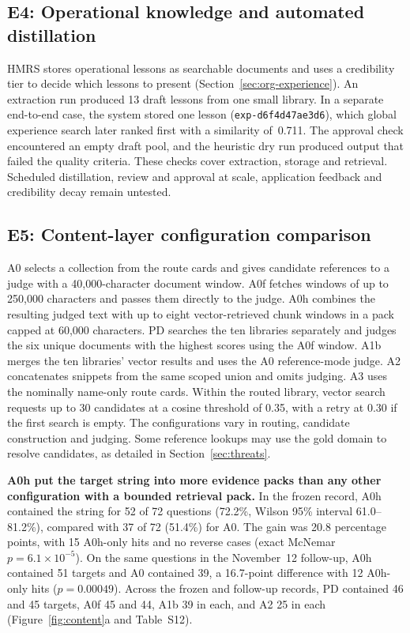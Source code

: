\subsection{E4: Operational knowledge and automated distillation}
\label{sec:e3}
HMRS stores operational lessons as searchable documents and uses a
credibility tier to decide which lessons to present
(Section~\ref{sec:org-experience}). An extraction run produced 13 draft
lessons from one small library. In a separate end-to-end case, the system
stored one lesson (\texttt{exp-d6f4d47ae3d6}), which global experience
search later ranked first with a similarity of~0.711. The approval check
encountered an empty draft pool, and the heuristic dry run produced output
that failed the quality criteria. These checks cover extraction, storage
and retrieval. Scheduled distillation, review and approval at scale,
application feedback and credibility decay remain untested.

\subsection{E5: Content-layer configuration comparison}
\label{sec:ladder-opt}
A0 selects a collection from the route cards and gives candidate references
to a judge with a 40{,}000-character document window. A0f fetches windows of
up to 250{,}000 characters and passes them directly to the judge. A0h
combines the resulting judged text with up to eight vector-retrieved chunk
windows in a pack capped at 60{,}000 characters. PD searches the ten libraries
separately and judges the six unique documents with the highest scores using
the A0f window. A1b merges the ten libraries' vector results and uses the A0
reference-mode judge. A2 concatenates snippets from the same scoped union
and omits judging. A3 uses the nominally name-only route cards. Within the
routed library, vector search requests up to 30 candidates at a cosine
threshold of 0.35, with a retry at 0.30 if the first search is empty.
The configurations vary in routing, candidate construction and judging.
Some reference lookups may use the gold domain to resolve candidates,
as detailed in Section~\ref{sec:threats}.

\textbf{A0h put the target string into more evidence packs than any other
configuration with a bounded retrieval pack.} In
the frozen record, A0h contained the string for 52 of 72 questions (72.2\%,
Wilson 95\% interval 61.0--81.2\%), compared with 37 of 72 (51.4\%) for A0.
The gain was 20.8 percentage points, with 15 A0h-only hits and no reverse
cases (exact McNemar $p=6.1\times10^{-5}$). On the same questions in the
November~12 follow-up, A0h contained 51 targets and A0 contained 39, a
16.7-point difference with 12 A0h-only hits ($p=0.00049$).
Across the frozen and follow-up records, PD contained 46 and 45
targets, A0f 45 and 44, A1b 39 in each, and A2 25 in each
(Figure~\ref{fig:content}a and Table~S12).


